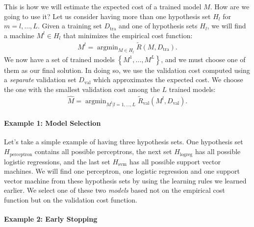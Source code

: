 \documentclass{report}
\DeclareMathOperator*{\argmin}{\arg \min}
\newcommand{\val}{\text{val}}
\newcommand{\tra}{\text{tra}}
\begin{document}
This is how we will estimate the expected cost of a trained model $M$. How are
we going to use it? Let us consider having more than one hypothesis set $H_l$
for $m=l, \ldots, L$. Given a training set $D_{\tra}$ and one of hypothesis sets
$H_l$, we will find a machine $M^l \in H_l$ that minimizes the empirical cost
function:
\begin{align*}
    M^l = \argmin_{M \in H_l} \tilde{R}(M, D_{\tra}).
\end{align*}
We now have a set of trained models $\left\{ M^1, \ldots, M^L \right\}$, and we
must choose one of them as our final solution. In doing so, we use the
validation cost computed using a {\it separate} validation set $D_{\val}$ which
approximates the expected cost. We choose the one with the smallest validation
cost among the $L$ trained models:
\begin{align*}
    \hat{M} = \argmin_{M^l|l=1,\ldots,L} \tilde{R}_{\val}(M^l, D_{\val}).
\end{align*}

\paragraph{Example 1: Model Selection}

Let's take a simple example of having three hypothesis sets. One hypothesis set
$H_{\text{perceptron}}$ contains all possible perceptrons, the next set
$H_{\text{logreg}}$ has all possible logistic regressions, and the last set
$H_{\text{svm}}$ has all possible support vector machines. We will find one
perceptron, one logistic regression and one support vector machine from these
hypothesis sets by using the learning rules we learned earlier.  We select one
of these two {\it models} based not on the empirical cost function but on the
validation cost function. 

\paragraph{Example 2: Early Stopping}
\end{document}
